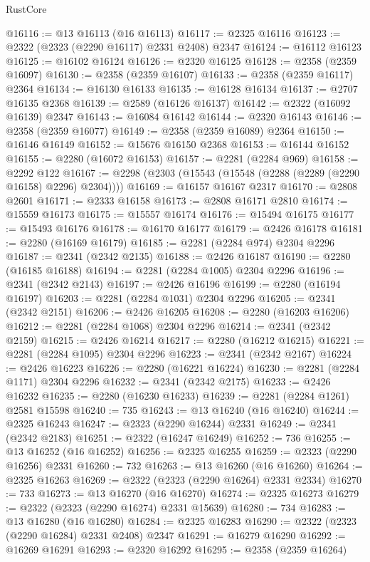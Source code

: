 \begin{lexlean}{RustCore}
\begin{coremodule}
@16116 := @13 @16113 (@16 @16113)
@16117 := @2325 @16116
@16123 := @2322 (@2323 (@2290 @16117) @2331 @2408) @2347
@16124 := @16112 @16123
@16125 := @16102 @16124
@16126 := @2320 @16125
@16128 := @2358 (@2359 @16097)
@16130 := @2358 (@2359 @16107)
@16133 := @2358 (@2359 @16117) @2364
@16134 := @16130 @16133
@16135 := @16128 @16134
@16137 := @2707 @16135 @2368
@16139 := @2589 (@16126 @16137)
@16142 := @2322 (@16092 @16139) @2347
@16143 := @16084 @16142
@16144 := @2320 @16143
@16146 := @2358 (@2359 @16077)
@16149 := @2358 (@2359 @16089) @2364
@16150 := @16146 @16149
@16152 := @15676 @16150 @2368
@16153 := @16144 @16152
@16155 := @2280 (@16072 @16153)
@16157 := @2281 (@2284 @969)
@16158 := @2292 @122
@16167 := @2298 (@2303 (@15543 (@15548 (@2288 (@2289 (@2290 @16158) @2296) @2304))))
@16169 := @16157 @16167 @2317
@16170 := @2808 @2601
@16171 := @2333 @16158
@16173 := @2808 @16171 @2810
@16174 := @15559 @16173
@16175 := @15557 @16174
@16176 := @15494 @16175
@16177 := @15493 @16176
@16178 := @16170 @16177
@16179 := @2426 @16178
@16181 := @2280 (@16169 @16179)
@16185 := @2281 (@2284 @974) @2304 @2296
@16187 := @2341 (@2342 @2135)
@16188 := @2426 @16187
@16190 := @2280 (@16185 @16188)
@16194 := @2281 (@2284 @1005) @2304 @2296
@16196 := @2341 (@2342 @2143)
@16197 := @2426 @16196
@16199 := @2280 (@16194 @16197)
@16203 := @2281 (@2284 @1031) @2304 @2296
@16205 := @2341 (@2342 @2151)
@16206 := @2426 @16205
@16208 := @2280 (@16203 @16206)
@16212 := @2281 (@2284 @1068) @2304 @2296
@16214 := @2341 (@2342 @2159)
@16215 := @2426 @16214
@16217 := @2280 (@16212 @16215)
@16221 := @2281 (@2284 @1095) @2304 @2296
@16223 := @2341 (@2342 @2167)
@16224 := @2426 @16223
@16226 := @2280 (@16221 @16224)
@16230 := @2281 (@2284 @1171) @2304 @2296
@16232 := @2341 (@2342 @2175)
@16233 := @2426 @16232
@16235 := @2280 (@16230 @16233)
@16239 := @2281 (@2284 @1261) @2581 @15598
@16240 := 735
@16243 := @13 @16240 (@16 @16240)
@16244 := @2325 @16243
@16247 := @2323 (@2290 @16244) @2331
@16249 := @2341 (@2342 @2183)
@16251 := @2322 (@16247 @16249)
@16252 := 736
@16255 := @13 @16252 (@16 @16252)
@16256 := @2325 @16255
@16259 := @2323 (@2290 @16256) @2331
@16260 := 732
@16263 := @13 @16260 (@16 @16260)
@16264 := @2325 @16263
@16269 := @2322 (@2323 (@2290 @16264) @2331 @2334)
@16270 := 733
@16273 := @13 @16270 (@16 @16270)
@16274 := @2325 @16273
@16279 := @2322 (@2323 (@2290 @16274) @2331 @15639)
@16280 := 734
@16283 := @13 @16280 (@16 @16280)
@16284 := @2325 @16283
@16290 := @2322 (@2323 (@2290 @16284) @2331 @2408) @2347
@16291 := @16279 @16290
@16292 := @16269 @16291
@16293 := @2320 @16292
@16295 := @2358 (@2359 @16264)

\end{coremodule}
\end{lexlean}
